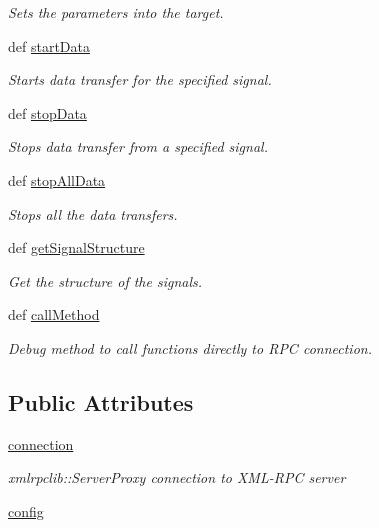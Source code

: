 \begin{DoxyCompactItemize}
\begin{DoxyCompactList}\small\item\em \-Sets the parameters into the target. \end{DoxyCompactList}\item 
def \hyperlink{classpyrtai_1_1connector_1_1_connector_a93dfb725ba3a80720e0158086291d50c}{start\-Data}
\begin{DoxyCompactList}\small\item\em \-Starts data transfer for the specified signal. \end{DoxyCompactList}\item 
def \hyperlink{classpyrtai_1_1connector_1_1_connector_a1e5ea349c801260afd34deb882eeb829}{stop\-Data}
\begin{DoxyCompactList}\small\item\em \-Stops data transfer from a specified signal. \end{DoxyCompactList}\item 
def \hyperlink{classpyrtai_1_1connector_1_1_connector_a575c80cf5c9561ebced640305a0c880a}{stop\-All\-Data}
\begin{DoxyCompactList}\small\item\em \-Stops all the data transfers. \end{DoxyCompactList}\item 
def \hyperlink{classpyrtai_1_1connector_1_1_connector_a68c69382ef3188bd3faacac379a9769d}{get\-Signal\-Structure}
\begin{DoxyCompactList}\small\item\em \-Get the structure of the signals. \end{DoxyCompactList}\item 
def \hyperlink{classpyrtai_1_1connector_1_1_connector_a181ac4778d034b760dcdd1831a94e111}{call\-Method}
\begin{DoxyCompactList}\small\item\em \-Debug method to call functions directly to \-R\-P\-C connection. \end{DoxyCompactList}\end{DoxyCompactItemize}
\subsection*{\-Public \-Attributes}
\begin{DoxyCompactItemize}
\item 
\hyperlink{classpyrtai_1_1connector_1_1_connector_a8a24261df24fa194bffaa7f3bed268cb}{connection}
\begin{DoxyCompactList}\small\item\em xmlrpclib\-::\-Server\-Proxy connection to \-X\-M\-L-\/\-R\-P\-C server \end{DoxyCompactList}\item 
\hyperlink{classpyrtai_1_1connector_1_1_connector_a44e0d21f1c12d1f649d9cd50d6146b52}{config}
\end{DoxyCompactItemize}


